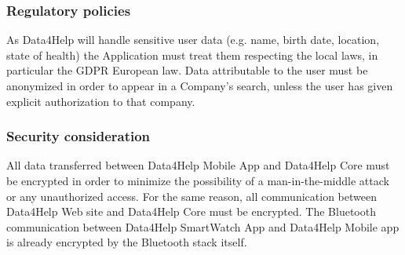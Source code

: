 \subsubsection{Regulatory policies}
As Data4Help will handle sensitive user data (e.g. name, birth date, location, state of health) the Application must treat them respecting the local laws, in particular the GDPR European law. Data attributable to the user must be anonymized in order to appear in a Company's search, unless the user has given explicit authorization to that company.

\subsubsection{Security consideration}
All data transferred between Data4Help Mobile App and Data4Help Core must be encrypted in order to minimize the possibility of a man-in-the-middle attack or any unauthorized access.
For the same reason, all communication between Data4Help Web site and Data4Help Core must be encrypted.
The Bluetooth communication between Data4Help SmartWatch App and Data4Help Mobile app is already encrypted by the Bluetooth stack itself.

